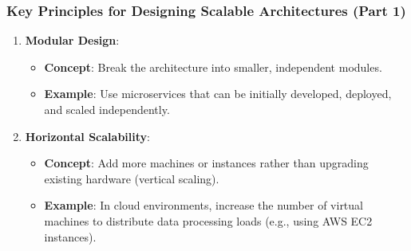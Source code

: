 \documentclass{beamer}
\begin{document}
\begin{frame}[fragile]
    \frametitle{Key Principles for Designing Scalable Architectures (Part 1)}
    \begin{enumerate}
        \item \textbf{Modular Design}:
            \begin{itemize}
                \item \textbf{Concept}: Break the architecture into smaller, independent modules.
                \item \textbf{Example}: Use microservices that can be initially developed, deployed, and scaled independently.
            \end{itemize}
        
        \item \textbf{Horizontal Scalability}:
            \begin{itemize}
                \item \textbf{Concept}: Add more machines or instances rather than upgrading existing hardware (vertical scaling).
                \item \textbf{Example}: In cloud environments, increase the number of virtual machines to distribute data processing loads (e.g., using AWS EC2 instances).
            \end{itemize}
    \end{enumerate}
\end{frame}
\end{document}
